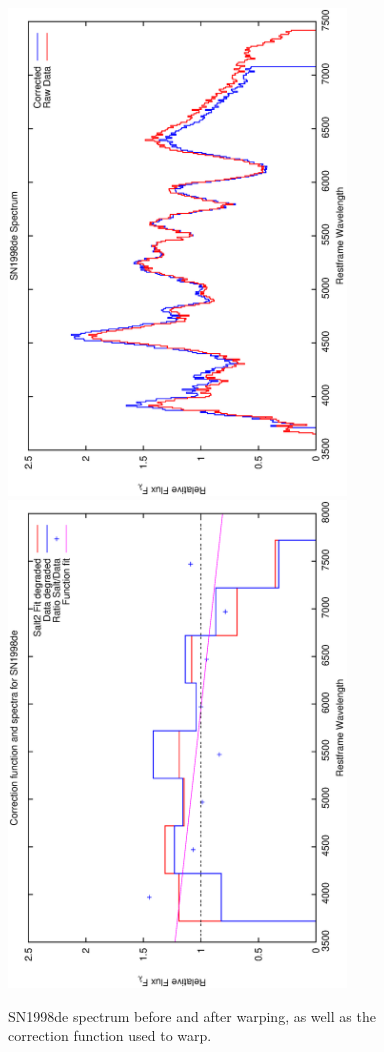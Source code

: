 \clearpage

\begin{figure}[p]
\centering
\includegraphics[angle=-90,width=0.8\textwidth]{./figures/spectrabeforeafter/SN1998de_handpicked_v001_v023_before_after_spectra.ps}
\hfill
\includegraphics[angle=-90,width=0.8\textwidth]{./figures/corrections/SN1998de_v001_correction.ps}
\hfill
\caption{SN1998de spectrum before and after warping, as well as the correction function used to warp.}
\label{fig:SN1998defour1}
\end{figure}

